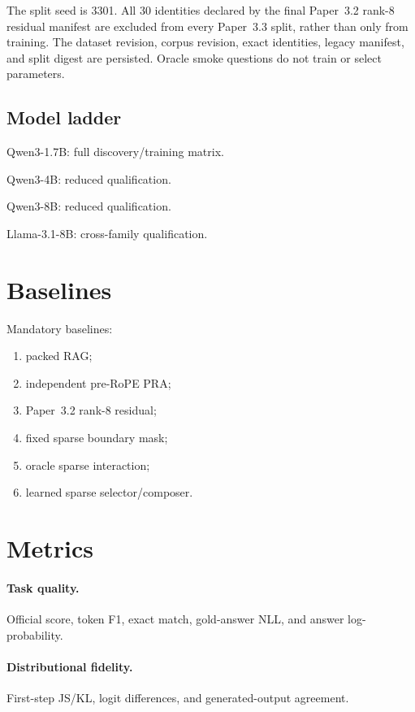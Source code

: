 \documentclass[11pt]{article}
\begin{document}
The split seed is 3301. All 30 identities declared by the final Paper~3.2
rank-8 residual manifest are excluded from every Paper~3.3 split, rather than
only from training. The dataset revision, corpus revision, exact identities,
legacy manifest, and split digest are persisted. Oracle smoke questions do not
train or select parameters.

\subsection{Model ladder}

\begin{description}[leftmargin=2cm]
    \item[M0] Qwen3-1.7B: full discovery/training matrix.
    \item[M1] Qwen3-4B: reduced qualification.
    \item[M2] Qwen3-8B: reduced qualification.
    \item[M3] Llama-3.1-8B: cross-family qualification.
\end{description}

\section{Baselines}

Mandatory baselines:
\begin{enumerate}[leftmargin=*]
    \item packed RAG;
    \item independent pre-RoPE PRA;
    \item Paper~3.2 rank-8 residual;
    \item fixed sparse boundary mask;
    \item oracle sparse interaction;
    \item learned sparse selector/composer.
\end{enumerate}

\section{Metrics}

\paragraph{Task quality.}
Official score, token F1, exact match, gold-answer NLL, and answer
log-probability.

\paragraph{Distributional fidelity.}
First-step JS/KL, logit differences, and generated-output agreement.
\end{document}
